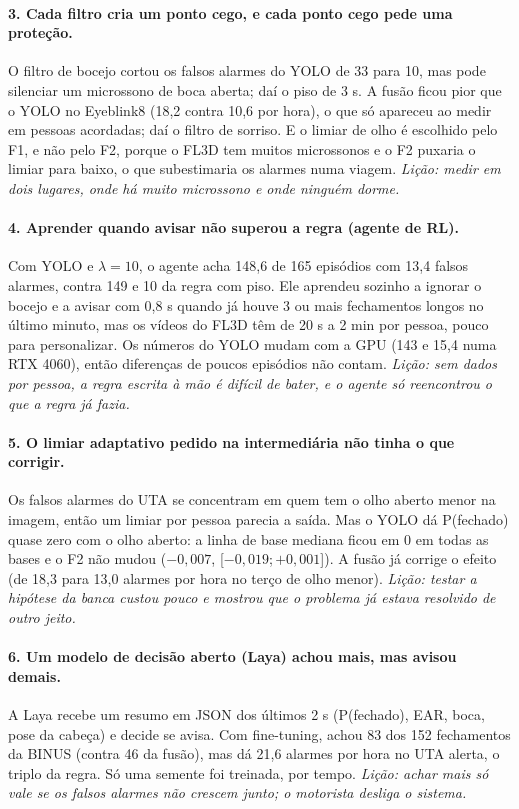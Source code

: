 \documentclass[11pt,a4paper]{article}
\newcommand{\ic}[2]{\textcolor{black!65}{[$#1$;\,$#2$]}}  %
\begin{document}
\paragraph{3. Cada filtro cria um ponto cego, e cada ponto cego pede uma proteção.} O filtro de bocejo cortou os falsos alarmes do YOLO de 33 para 10, mas pode silenciar um microssono de boca aberta; daí o piso de 3 s. A fusão ficou pior que o YOLO no Eyeblink8 (18,2 contra 10,6 por hora), o que só apareceu ao medir em pessoas acordadas; daí o filtro de sorriso. E o limiar de olho é escolhido pelo F1, e não pelo F2, porque o FL3D tem muitos microssonos e o F2 puxaria o limiar para baixo, o que subestimaria os alarmes numa viagem. \emph{Lição: medir em dois lugares, onde há muito microssono e onde ninguém dorme.}

\paragraph{4. Aprender quando avisar não superou a regra (agente de RL).} Com YOLO e $\lambda = 10$, o agente acha 148,6 de 165 episódios com 13,4 falsos alarmes, contra 149 e 10 da regra com piso. Ele aprendeu sozinho a ignorar o bocejo e a avisar com 0,8 s quando já houve 3 ou mais fechamentos longos no último minuto, mas os vídeos do FL3D têm de 20 s a 2 min por pessoa, pouco para personalizar. Os números do YOLO mudam com a GPU (143 e 15,4 numa RTX 4060), então diferenças de poucos episódios não contam. \emph{Lição: sem dados por pessoa, a regra escrita à mão é difícil de bater, e o agente só reencontrou o que a regra já fazia.}

\paragraph{5. O limiar adaptativo pedido na intermediária não tinha o que corrigir.} Os falsos alarmes do UTA se concentram em quem tem o olho aberto menor na imagem, então um limiar por pessoa parecia a saída. Mas o YOLO dá P(fechado) quase zero com o olho aberto: a linha de base mediana ficou em 0 em todas as bases e o F2 não mudou ($-0{,}007$, \ic{-0{,}019}{+0{,}001}). A fusão já corrige o efeito (de 18,3 para 13,0 alarmes por hora no terço de olho menor). \emph{Lição: testar a hipótese da banca custou pouco e mostrou que o problema já estava resolvido de outro jeito.}

\paragraph{6. Um modelo de decisão aberto (Laya) achou mais, mas avisou demais.} A Laya recebe um resumo em JSON dos últimos 2 s (P(fechado), EAR, boca, pose da cabeça) e decide se avisa. Com fine-tuning, achou 83 dos 152 fechamentos da BINUS (contra 46 da fusão), mas dá 21,6 alarmes por hora no UTA alerta, o triplo da regra. Só uma semente foi treinada, por tempo. \emph{Lição: achar mais só vale se os falsos alarmes não crescem junto; o motorista desliga o sistema.}
\end{document}
